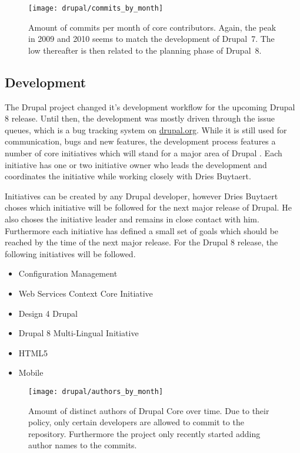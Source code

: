 \begin{figure}[htbp]
  \centering
  \texttt{[image: drupal/commits\_by\_month]}
  \caption{Amount of commits per month of core contributors. Again, the peak in
  2009 and 2010 seems to match the development of Drupal~7. The low thereafter
  is then related to the planning phase of Drupal~8.}
\end{figure}


\subsection{Development} %

The Drupal project changed it's development workflow for the upcoming Drupal 8
release. Until then, the development was mostly driven through the issue
queues, which is a bug tracking system on \url{drupal.org}. While it is still
used for communication, bugs and new features, the development process features
a number of core initiatives which will stand for a major area of Drupal
\cite{DrupalInitiatives}. Each initiative has one or two initiative owner who
leads the development and coordinates the initiative while working closely with
Dries Buytaert.

Initiatives can be created by any Drupal developer, however Dries Buytaert
choses which initiative will be followed for the next major release of Drupal.
He also choses the initiative leader and remains in close contact with him.
Furthermore each initiative has defined a small set of goals which should be
reached by the time of the next major release. For the Drupal 8 release, the
following initiatives will be followed.

\begin{itemize}
  \item Configuration Management
  \item Web Services Context Core Initiative
  \item Design 4 Drupal
  \item Drupal 8 Multi-Lingual Initiative
  \item HTML5
  \item Mobile
\end{itemize}

\begin{figure}[htbp]
  \centering
  \texttt{[image: drupal/authors\_by\_month]}
  \caption{Amount of distinct authors of Drupal Core over time. Due to their
  policy, only certain developers are allowed to commit to the repository.
  Furthermore the project only recently started adding author names to the
  commits.}
\end{figure}


